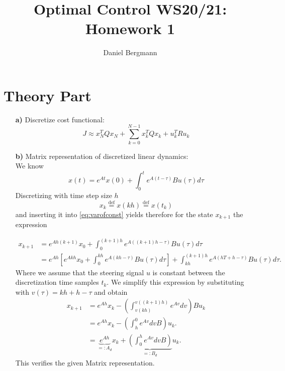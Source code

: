 \documentclass[]{article}
\title{Optimal Control WS20/21: Homework 1}
\author{Daniel Bergmann}
\newcommand{\trp}{^T}
\newcommand{\xnull}{x_0}
\newcommand{\xN}{x_N}
\newcommand{\xk}{x_k}
\newcommand{\uk}{u_k}
\newcommand{\Ad}{A_d}
\newcommand{\Bd}{B_d}
\newcommand{\xkplus}{x_{k+1}}
\newcommand{\tk}{t_{k}}
\begin{document}
\maketitle

\section{Theory Part}
\begin{enumerate}
	\item[\bf a)] Discretize cost functional:\\
	 	\begin{equation}
			 J \approx  \xN\trp Q \xN + \sum_{k = 0}^{N-1} \xk \trp Q \xk + \uk\trp R \uk
	 	\end{equation}
		
	\item[\bf b)] Matrix representation of discretized linear dynamics:\\
	
	We know
	\begin{equation}
		x(t) = e^{At} x(0) + \int_{0}^{t} e^{A(t-\tau)} B u(\tau) d\tau \label{eq:varofconst}
	\end{equation}
		Discretizing  with time step size $ h $ \[ \xk \overset{\mathrm{def}}{=} x(kh) \overset{\mathrm{def}}{=} x(t_k) \] and inserting it into  \eqref{eq:varofconst} yields therefore for the state $ \xkplus $ the expression
		
		\begin{align}
			\xkplus &= e^{Ah(k+1)} \xnull + \int_{0}^{(k+1)h} e^{A((k+1)h-\tau)} Bu(\tau) d\tau\\
					&= e^{Ah}\left[ e^{Akh}\xnull + \int_{0}^{kh} e^{A(kh-\tau)}Bu(\tau) d\tau\right] + \int_{kh}^{(k+1)h} e^{A(hT+h-\tau)}Bu(\tau) d\tau.
		\end{align}
		Where we assume that the steering signal $ u $ is constant between the discretization time samples $ \tk. $
		We simplify this expression  by substituting with $ v(\tau) = kh + h - \tau $ and obtain
		\begin{align}
			\xkplus &= e^{Ah}\xk - \left( \int_{v(kh)}^{v((k+1)h)} e^{Av} dv \right) B\uk\\
			&= e^{Ah}\xk - \left(\int_{h}^{0} e^{Av} dv B \right) \uk.\\
					&= \underbrace{e^{Ah}}_{=:\Ad}\xk + \underbrace{\left(\int_{0}^{h} e^{Av} dv B \right)}_{=:\Bd}   \uk. \label{eq:exactdiscr}
		\end{align}
		This verifies the given Matrix representation.


\end{enumerate}
\end{document}
